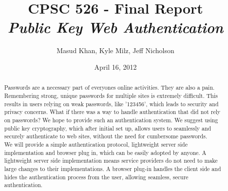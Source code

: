 \documentclass[11pt]{article}
\begin{document}
\title{\bf CPSC 526 - Final Report \\ \emph{Public Key Web Authentication}}
\author{Masud Khan, Kyle Milz, Jeff Nicholson}
\date{April 16, 2012} 
\maketitle

\tableofcontents
\pagebreak
\begin{abstract}
Passwords are a necessary part of everyones online activities. They are also a pain. Remembering strong, unique passwords for multiple sites is extremely difficult. This results in users relying on weak passwords, like '123456', which leads to security and privacy concerns. What if there was a way to handle authentication that did not rely on passwords? We hope to provide such an authentication system. We suggest using public key cryptography, which after initial set up, allows users to seamlessly and securely authenticate to web sites, without the need for cumbersome passwords.\\
We will provide a simple authentication protocol, lightweight server side implementation and browser plug in, which can be easily adopted by anyone. A lightweight server side implementation means service providers do not need to make large changes to their implementations. A browser plug-in handles the client side and hides the authentication process from the user, allowing seamless, secure authentication.
\end{abstract}
\pagebreak
\end{document}
